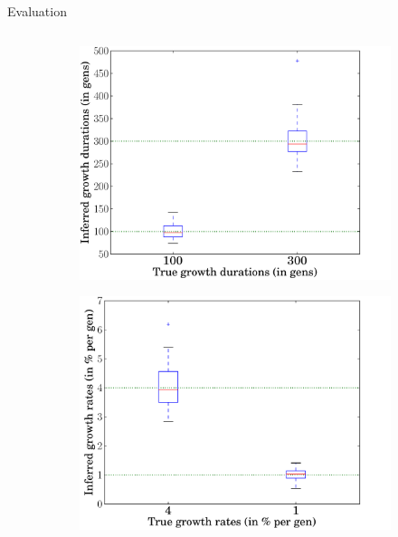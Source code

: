 \documentclass[final,hyperref={pdfpagelabels=false},professionalfonts,mathserif]{beamer}
\begin{document}
\begin{frame}[fragile]
\begin{columns}[t]
\begin{column}{.495\linewidth}
\begin{block}{\large Evaluation}
\begin{columns}[T]
\begin{column}{0.97\linewidth}
				\begin{figure}[H]
				  \begin{subfigure}[b]{0.48\linewidth}
				      \centering
				      \includegraphics[type=pdf,ext=.pdf,read=.pdf]{figs/our_method_2epoch_r4t100r1t300_rho0.4_n20000_boxPlotTOnsets}
				        \caption{}
				      \label{fig:inferred_params_2epoch_duration}
				    \end{subfigure}
				  \begin{subfigure}[b]{0.48\linewidth}
				      \centering
				      \includegraphics[type=pdf,ext=.pdf,read=.pdf]{figs/our_method_2epoch_r4t100r1t300_rho0.4_n20000_boxPlotRs}
				        \caption{}
				      \label{fig:inferred_params_2epoch_growth_rate}

\end{subfigure}
\end{figure}
\end{column}
\end{columns}
\end{block}
\end{column}
\end{columns}
\end{frame}
\end{document}

